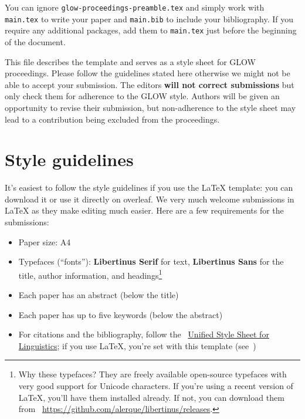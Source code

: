 You can ignore \texttt{glow-proceedings-preamble.tex} and simply work with
\texttt{main.tex} to write your paper and \texttt{main.bib} to include your
bibliography. If you require any additional packages, add them to
\texttt{main.tex} just before the beginning of the document.

This file describes the template and serves as a style sheet for GLOW
proceedings. Please follow the guidelines stated here otherwise we might not be
able to accept your submission. The editors \textbf{will not correct
submissions} but only check them for adherence to the GLOW style. Authors will
be given an opportunity to revise their submission, but non-adherence to the
style sheet may lead to a contribution being excluded from the proceedings.

\section{Style guidelines}

It's easiest to follow the style guidelines if you use the \LaTeX{} template:
you can download it or use it directly on overleaf. We very much welcome
submissions in \LaTeX{} as they make editing much easier.
%
Here are a few requirements for the submissions:

\begin{itemize}
    \item Paper size: A4
    \item Typefaces (\enquote{fonts}): \textbf{Libertinus Serif} for text,
        \textbf{Libertinus Sans} for the title, author information, and
        headings\footnote{Why these typefaces? They are freely available
        open-source typefaces with very good support for Unicode characters.
        If you're using a recent version of \LaTeX{}, you'll have them
        installed already. If not, you can download them from
        \faExternalLink*{}~\url{https://github.com/alerque/libertinus/releases}.}
    \item Each paper has an abstract (below the title)
    \item Each paper has up to five keywords (below the abstract)
    \item For citations and the bibliography, follow the
    \faExternalLink*{}~\href{https://clas.wayne.edu/linguistics/resources/style}{Unified
    Style Sheet for Linguistics}; if you use \LaTeX{}, you're set with this
    template (see~)
\end{itemize}

